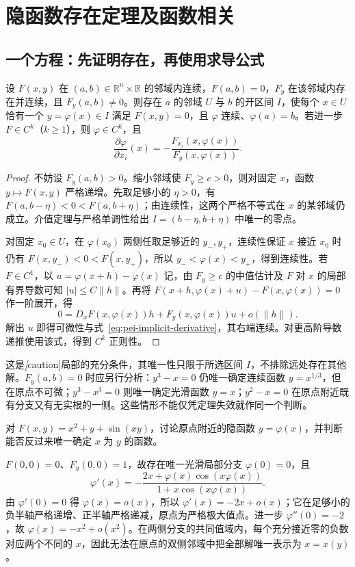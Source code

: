 \section{隐函数存在定理及函数相关}
\label{sec:pei-implicit-dependence}

\subsection{一个方程：先证明存在，再使用求导公式}

\begin{theorem}
\label{thm:pei-scalar-implicit}
设 $F(x,y)$ 在 $(a,b)\in\mathbb R^n\times\mathbb R$ 的邻域内连续，$F(a,b)=0$，$F_y$ 在该邻域内存在并连续，且 $F_y(a,b)\ne0$。则存在 $a$ 的邻域 $U$ 与 $b$ 的开区间 $I$，使每个 $x\in U$ 恰有一个 $y=\varphi(x)\in I$ 满足 $F(x,y)=0$，且 $\varphi$ 连续、$\varphi(a)=b$。若进一步 $F\in C^k$（$k\ge1$），则 $\varphi\in C^k$，且
\begin{equation}
\label{eq:pei-implicit-derivative}
\frac{\partial\varphi}{\partial x_i}(x)=-\frac{F_{x_i}(x,\varphi(x))}{F_y(x,\varphi(x))}.
\end{equation}
\end{theorem}
\begin{proof}
不妨设 $F_y(a,b)>0$。缩小邻域使 $F_y\ge c>0$，则对固定 $x$，函数 $y\mapsto F(x,y)$ 严格递增。先取足够小的 $\eta>0$，有 $F(a,b-\eta)<0<F(a,b+\eta)$；由连续性，这两个严格不等式在 $x$ 的某邻域仍成立。介值定理与严格单调性给出 $I=(b-\eta,b+\eta)$ 中唯一的零点。

对固定 $x_0\in U$，在 $\varphi(x_0)$ 两侧任取足够近的 $y_-,y_+$，连续性保证 $x$ 接近 $x_0$ 时仍有 $F(x,y_-)<0<F(x,y_+)$，所以 $y_-<\varphi(x)<y_+$，得到连续性。若 $F\in C^1$，以 $u=\varphi(x+h)-\varphi(x)$ 记，由 $F_y\ge c$ 的中值估计及 $F$ 对 $x$ 的局部有界导数可知 $|u|\le C\|h\|$。再将 $F(x+h,\varphi(x)+u)-F(x,\varphi(x))=0$ 作一阶展开，得
\[
0=D_xF(x,\varphi(x))h+F_y(x,\varphi(x))u+o(\|h\|).
\]
解出 $u$ 即得可微性与式~\eqref{eq:pei-implicit-derivative}，其右端连续。对更高阶导数递推使用该式，得到 $C^k$ 正则性。
\end{proof}

这是\emph[caution]{局部的充分条件}，其唯一性只限于所选区间 $I$，不排除远处存在其他解。$F_y(a,b)=0$ 时应另行分析：$y^3-x=0$ 仍唯一确定连续函数 $y=x^{1/3}$，但在原点不可微；$y^3-x^3=0$ 则唯一确定光滑函数 $y=x$；$y^2-x=0$ 在原点附近既有分支又有无实根的一侧。这些情形不能仅凭定理失效就作同一个判断。

\begin{example}
\label{ex:pei-implicit-non-invertibility}
对 $F(x,y)=x^2+y+\sin(xy)$，讨论原点附近的隐函数 $y=\varphi(x)$，并判断能否反过来唯一确定 $x$ 为 $y$ 的函数。
\end{example}
\begin{solve}
$F(0,0)=0$、$F_y(0,0)=1$，故存在唯一光滑局部分支 $\varphi(0)=0$，且
\[
\varphi'(x)=-\frac{2x+\varphi(x)\cos(x\varphi(x))}{1+x\cos(x\varphi(x))}.
\]
由 $\varphi'(0)=0$ 得 $\varphi(x)=o(x)$，所以 $\varphi'(x)=-2x+o(x)$；它在足够小的负半轴严格递增、正半轴严格递减，原点为严格极大值点。进一步 $\varphi''(0)=-2$，故 $\varphi(x)=-x^2+o(x^2)$。在两侧分支的共同值域内，每个充分接近零的负数对应两个不同的 $x$，因此无法在原点的双侧邻域中把全部解唯一表示为 $x=x(y)$。
\end{solve}

